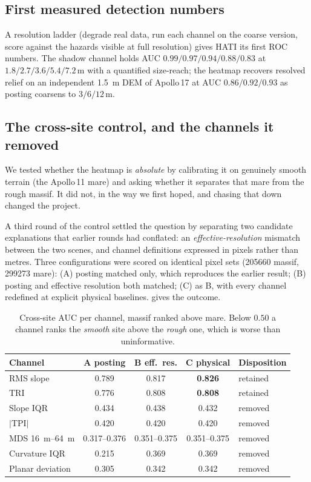 \documentclass[11pt]{article}
\begin{document}
\subsection{First measured detection numbers}
A resolution ladder (degrade real data, run each channel on the coarse version, score against
the hazards visible at full resolution) gives HATI its first ROC numbers. The shadow channel
holds AUC $0.99/0.97/0.94/0.88/0.83$ at $1.8/2.7/3.6/5.4/7.2$\,m with a quantified size-reach;
the heatmap recovers resolved relief on an independent \SI{1.5}{\meter} DEM of Apollo\,17 at AUC
$0.86/0.92/0.93$ as posting coarsens to $3/6/12$\,m.

\subsection{The cross-site control, and the channels it removed}
\label{sec:control}
We tested whether the heatmap is \emph{absolute} by calibrating it on genuinely smooth terrain
(the Apollo\,11 mare) and asking whether it separates that mare from the rough massif. It did
not, in the way we first hoped, and chasing that down changed the project.

A third round of the control settled the question by separating two candidate explanations that
earlier rounds had conflated: an \emph{effective-resolution} mismatch between the two scenes, and
channel definitions expressed in pixels rather than metres. Three configurations were scored on
identical pixel sets (\num{205660} massif, \num{299273} mare): (A) posting matched only, which
reproduces the earlier result; (B) posting and effective resolution both matched; (C) as B, with
every channel redefined at explicit physical baselines.  gives the outcome.

\begin{table}[h]
\centering\small
\caption{Cross-site AUC per channel, massif ranked above mare. Below $0.50$ a channel ranks the
\emph{smooth} site above the \emph{rough} one, which is worse than uninformative.}
\label{tab:channels}
\begin{tabular}{lccc l}
\toprule
Channel & A posting & B eff.\ res. & C physical & Disposition \\
\midrule
RMS slope        & 0.789 & 0.817 & \textbf{0.826} & retained \\
TRI              & 0.776 & 0.808 & \textbf{0.808} & retained \\
\midrule
Slope IQR        & 0.434 & 0.438 & 0.432 & removed \\
$|$TPI$|$        & 0.420 & 0.420 & 0.420 & removed \\
MDS \SIrange{16}{64}{\meter} & 0.317--0.376 & 0.351--0.375 & 0.351--0.375 & removed \\
Curvature IQR    & 0.215 & 0.369 & 0.369 & removed \\
Planar deviation & 0.305 & 0.342 & 0.342 & removed \\
\bottomrule
\end{tabular}
\end{table}
\end{document}
